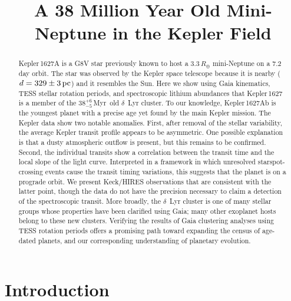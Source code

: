 \documentclass[12pt,modern,twocolumn,tighten]{aastex63}
\newcommand{\clusterage}{$38^{+6}_{-5}$\,Myr} %
\begin{document}
\title{
  A 38 Million Year Old Mini-Neptune in the Kepler Field
}

\NewPageAfterKeywords


\begin{abstract}
  Kepler\,1627A is a G8V star previously known to host a
  $3.3\,R_\oplus$ mini-Neptune on a 7.2\,day orbit.  The star was
  observed by the Kepler space telescope because it is nearby
  ($d=329\pm3\,{\rm pc}$) and it resembles the Sun.  Here we show
  using Gaia kinematics, TESS stellar rotation periods, and
  spectroscopic lithium abundances that Kepler\,1627 is a member of
  the \clusterage\ old $\delta$~Lyr cluster.  To our knowledge,
  Kepler\,1627Ab is the youngest planet with a precise age yet found
  by the main Kepler mission.  The Kepler data show two notable
  anomalies.  First, after removal of the stellar variability, the
  average Kepler transit profile appears to be asymmetric.  One
  possible explanation is that a dusty atmospheric outflow is present,
  but this remains to be confirmed.  Second, the individual transits
  show a correlation between the transit time and the local slope of
  the light curve.  Interpreted in a framework in which unresolved
  starspot-crossing events cause the transit timing variations, this
  suggests that the planet is on a prograde orbit.  We present
  Keck/HIRES observations that are consistent with the latter point, though
  the data do not have the precision necessary to claim a detection of the
  spectroscopic transit.  More broadly, the $\delta$~Lyr cluster
  is one of many stellar groups whose properties have been clarified
  using Gaia; many other exoplanet hosts belong to these new clusters.
  Verifying the results of Gaia clustering analyses using TESS
  rotation periods offers a promising path toward expanding the census
  of age-dated planets, and our corresponding understanding of
  planetary evolution.
\end{abstract}




\section{Introduction}
\end{document}
